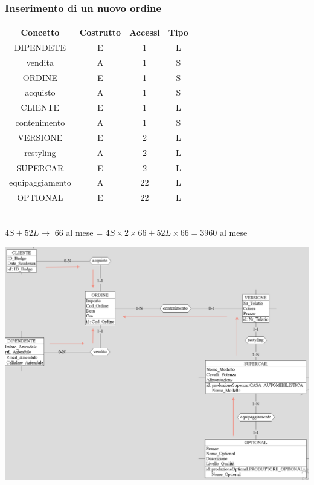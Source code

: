 \documentclass[11pt]{article}
\begin{document}
\subsubsection{Inserimento di un nuovo ordine} 

\begin{table}[H]
    \centering
    \begin{tabular}{ c c c c } 
        \rowcolor{red!20!}
        \textbf{Concetto} & \textbf{Costrutto} & \textbf{Accessi} &
        \textbf{Tipo}\\ 
        DIPENDETE & E & 1 & L \\
        vendita & A & 1 & S \\
        ORDINE & E & 1 & S \\ 
        acquisto & A & 1 & S \\
        CLIENTE & E & 1 & L \\  
        contenimento & A & 1 & S \\
        VERSIONE & E & 2 & L \\
        restyling & A & 2 & L \\
        SUPERCAR & E & 2 & L \\ 
        equipaggiamento & A & 22 & L \\
        OPTIONAL & E & 22 & L \\
    \end{tabular}\\
    \( 4S + 52L \rightarrow \) 66 al mese = \( 4S \times 2 \times 66 + 52L \times
    66 = 3960\) al mese
\end{table}

\begin{center}
    \includegraphics[scale=0.53]{images/navigationSchemes/creaOrdine.png}
\end{center}
\end{document}
